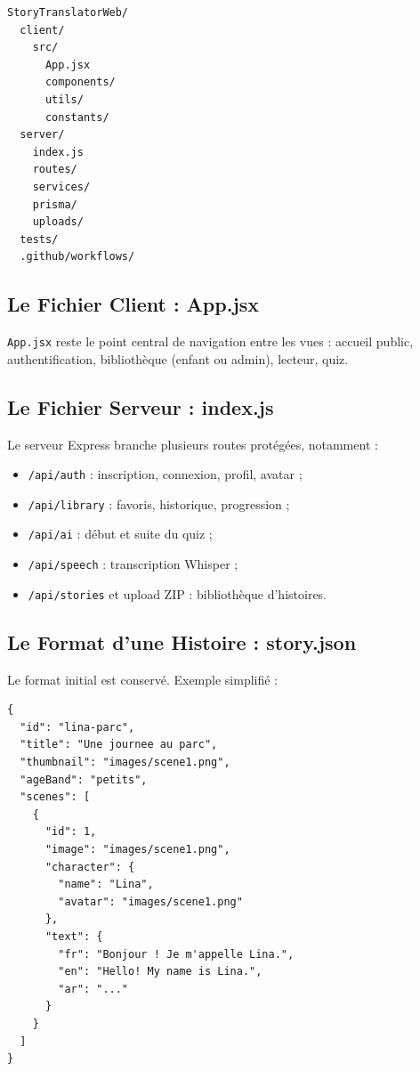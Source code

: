 \documentclass[12pt,twoside,letterpaper]{article}
\begin{document}
\begin{verbatim}
StoryTranslatorWeb/
  client/
    src/
      App.jsx
      components/
      utils/
      constants/
  server/
    index.js
    routes/
    services/
    prisma/
    uploads/
  tests/
  .github/workflows/
\end{verbatim}

\subsection{Le Fichier Client : App.jsx}

\texttt{App.jsx} reste le point central de navigation entre les vues :
accueil public, authentification, biblioth\`eque (enfant ou admin), lecteur, quiz.

\subsection{Le Fichier Serveur : index.js}

Le serveur Express branche plusieurs routes prot\'eg\'ees, notamment :
\begin{itemize}[leftmargin=*]
  \item \texttt{/api/auth} : inscription, connexion, profil, avatar ;
  \item \texttt{/api/library} : favoris, historique, progression ;
  \item \texttt{/api/ai} : d\'ebut et suite du quiz ;
  \item \texttt{/api/speech} : transcription Whisper ;
  \item \texttt{/api/stories} et upload ZIP : biblioth\`eque d'histoires.
\end{itemize}

\subsection{Le Format d'une Histoire : story.json}

Le format initial est conserv\'e. Exemple simplifi\'e :

\begin{verbatim}
{
  "id": "lina-parc",
  "title": "Une journee au parc",
  "thumbnail": "images/scene1.png",
  "ageBand": "petits",
  "scenes": [
    {
      "id": 1,
      "image": "images/scene1.png",
      "character": {
        "name": "Lina",
        "avatar": "images/scene1.png"
      },
      "text": {
        "fr": "Bonjour ! Je m'appelle Lina.",
        "en": "Hello! My name is Lina.",
        "ar": "..."
      }
    }
  ]
}
\end{verbatim}
\end{document}
